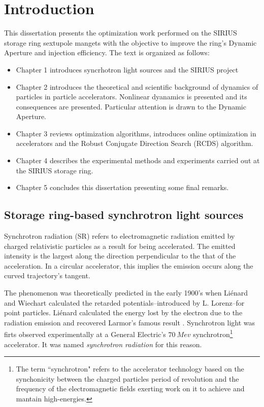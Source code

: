 \chapter{Introduction}
This dissertation presents the optimization work performed on the SIRIUS storage ring sextupole mangets with the objective to improve the ring's Dynamic Aperture and injection efficiency. The text is organized as follows:
\begin{itemize}
    \item Chapter 1 introduces syncrhotron light sources and the SIRIUS project
    \item Chapter 2 introduces the theoretical and scientific background of dynamics of particles in particle accelerators. Nonlinear dyanamics is presented and its consequences are presented. Particular attention is drawn to the Dynamic Aperture.
    \item Chapter 3 reviews optimization algorithms, introduces online optimization in accelerators and the Robust Conjugate Direction Search (RCDS) algorithm.
    \item Chapter 4 describes the experimental methods and experiments carried out at the SIRIUS storage ring.
    \item Chapter 5 concludes this dissertation presenting some final remarks.
\end{itemize}

\section{Storage ring-based synchrotron light sources}

Synchrotron radiation (SR) refers to electromagnetic radiation emitted by charged relativistic particles as a result for being accelerated. The emitted intensity is the largest along the direction perpendicular to the that of the acceleration. In a circular accelerator, this implies the emission occurs along the curved trajectory's tangent.

The phenomenon was theoretically predicted in the early 1900's when Liénard  and Wiechart calculated the retarded potentials--introduced by L. Lorenz--for point particles. Liénard calculated the energy lost by the electron due to the radiation emission and recovered Larmor's famous result . Synchrotron light was firts observed experimentally at a General Electric's $70~\unit{Mev}$ synchrotron\footnote{The term ``synchrotron" refers to the accelerator  technology based on the synchonicity between the charged particles period of revolution and the frequency of the electromagnetic fields exerting work on it to achieve and mantain high-energies.} accelerator. It was named \textit{synchrotron radiation} for this reason.

